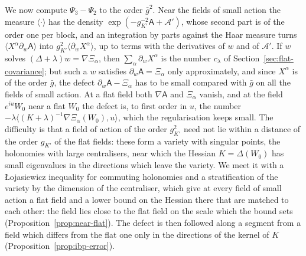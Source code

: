 \documentclass[11pt]{preprint}
\numberwithin{equation}{section}
\theoremstyle{definition}
\theoremstyle{remark}
\theoremstyle{plain}
\begin{document}
We now compute $\Psi_3 - \Psi_2$ to the order $\bar g^2$. Near the fields of small action the measure $\langle\cdot\rangle$ has the density $\exp(-g_{K'}^{-2}\mathsf A + \mathcal A')$, whose second part is of the order one per block, and an integration by parts against the Haar measure turns $\langle X^\alpha\partial_w\mathsf A\rangle$ into $g_{K'}^2\langle\partial_wX^\alpha\rangle$, up to terms with the derivatives of $w$ and of $\mathcal A'$. If $w$ solves $(\Delta + \lambda)w = \nabla\Xi_\alpha$, then $\sum_\alpha\partial_wX^\alpha$ is the number $c_\lambda$ of Section~\ref{sec:flat-covariance}; but such a $w$ satisfies $\partial_w\mathsf A = \Xi_\alpha$ only approximately, and since $X^\alpha$ is of the order $\bar g$, the defect $\partial_w\mathsf A - \Xi_\alpha$ has to be small compared with $\bar g$ on all the fields of small action. At a flat field both $\nabla\mathsf A$ and $\Xi_\alpha$ vanish, and at the field $e^{iu}W_0$ near a flat $W_0$ the defect is, to first order in $u$, the number $-\lambda\langle(K + \lambda)^{-1}\nabla\Xi_\alpha(W_0), u\rangle$, which the regularisation keeps small. The difficulty is that a field of action of the order $g_{K'}^2$ need not lie within a distance of the order $g_{K'}$ of the flat fields: these form a variety with singular points, the holonomies with large centralisers, near which the Hessian $K = \Delta(W_0)$ has small eigenvalues in the directions which leave the variety. We meet it with a {\L}ojasiewicz inequality for commuting holonomies and a stratification of the variety by the dimension of the centraliser, which give at every field of small action a flat field and a lower bound on the Hessian there that are matched to each other: the field lies close to the flat field on the scale which the bound sets (Proposition~\ref{prop:near-flat}). The defect is then followed along a segment from a field which differs from the flat one only in the directions of the kernel of $K$ (Proposition~\ref{prop:ibp-error}).
\end{document}
